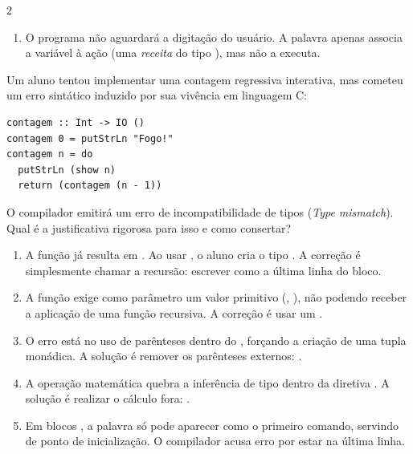 \documentclass[a4paper,10pt,brazil]{article}
\begin{document}
\begin{multicols}{2}
\begin{enumerate}
  \item O programa não aguardará a digitação do usuário. A palavra  apenas associa a variável  à ação (uma \emph{receita} do tipo ), mas não a executa.


\end{enumerate}

Um aluno tentou implementar uma contagem regressiva interativa, mas cometeu um erro sintático induzido por sua vivência em linguagem C:

\begin{verbatim}
contagem :: Int -> IO ()
contagem 0 = putStrLn "Fogo!"
contagem n = do
  putStrLn (show n)
  return (contagem (n - 1))
\end{verbatim}

O compilador emitirá um erro de incompatibilidade de tipos (\emph{Type mismatch}). Qual é a justificativa rigorosa para isso e como consertar?

\begin{enumerate}
  \item A função  já resulta em . Ao usar , o aluno cria o tipo . A correção é simplesmente chamar a recursão: escrever  como a última linha do bloco.

  \item A função  exige como parâmetro um valor primitivo (, ), não podendo receber a aplicação de uma função recursiva. A correção é usar um .

  \item O erro está no uso de parênteses dentro do , forçando a criação de uma tupla monádica. A solução é remover os parênteses externos: .

  \item A operação matemática  quebra a inferência de tipo dentro da diretiva . A solução é realizar o cálculo fora: .
  \item Em blocos , a palavra  só pode aparecer como o primeiro comando, servindo de ponto de inicialização. O compilador acusa erro por estar na última linha.



\end{enumerate}
\end{multicols}
\end{document}
